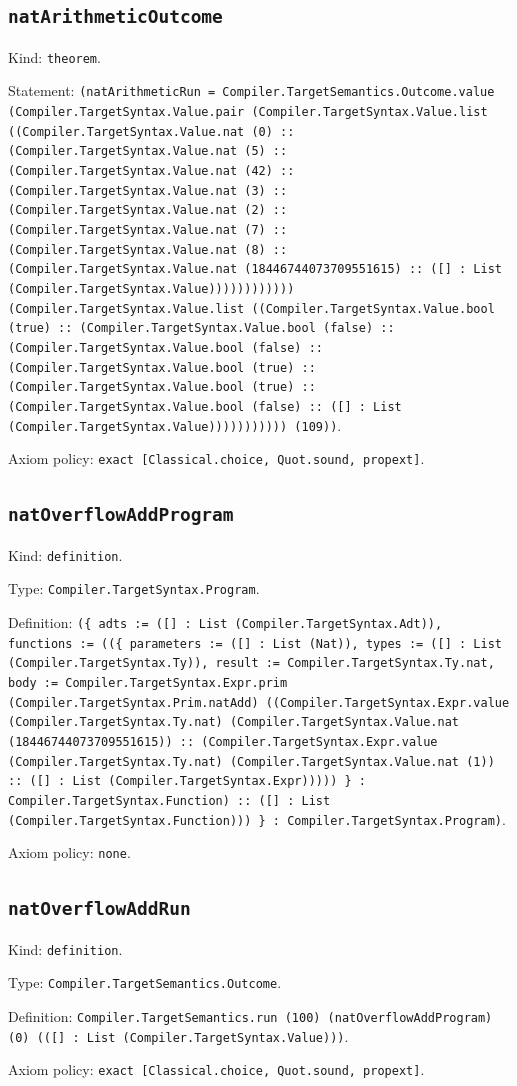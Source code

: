 \documentclass[11pt]{article}
\begin{document}
\subsection*{\texttt{natArithmeticOutcome}}
\noindent Kind: \texttt{theorem}.\par
\noindent Statement: \texttt{(natArithmeticRun = Compiler.TargetSemantics.Outcome.value (Compiler.TargetSyntax.Value.pair (Compiler.TargetSyntax.Value.list ((Compiler.TargetSyntax.Value.nat (0) :: (Compiler.TargetSyntax.Value.nat (5) :: (Compiler.TargetSyntax.Value.nat (42) :: (Compiler.TargetSyntax.Value.nat (3) :: (Compiler.TargetSyntax.Value.nat (2) :: (Compiler.TargetSyntax.Value.nat (7) :: (Compiler.TargetSyntax.Value.nat (8) :: (Compiler.TargetSyntax.Value.nat (18446744073709551615) :: ([] : List (Compiler.TargetSyntax.Value)))))))))))) (Compiler.TargetSyntax.Value.list ((Compiler.TargetSyntax.Value.bool (true) :: (Compiler.TargetSyntax.Value.bool (false) :: (Compiler.TargetSyntax.Value.bool (false) :: (Compiler.TargetSyntax.Value.bool (true) :: (Compiler.TargetSyntax.Value.bool (true) :: (Compiler.TargetSyntax.Value.bool (false) :: ([] : List (Compiler.TargetSyntax.Value))))))))))) (109))}.\par
\noindent Axiom policy: \texttt{exact [Classical.choice, Quot.sound, propext]}.\par
\subsection*{\texttt{natOverflowAddProgram}}
\noindent Kind: \texttt{definition}.\par
\noindent Type: \texttt{Compiler.TargetSyntax.Program}.\par
\noindent Definition: \texttt{(\{ adts := ([] : List (Compiler.TargetSyntax.Adt)), functions := ((\{ parameters := ([] : List (Nat)), types := ([] : List (Compiler.TargetSyntax.Ty)), result := Compiler.TargetSyntax.Ty.nat, body := Compiler.TargetSyntax.Expr.prim (Compiler.TargetSyntax.Prim.natAdd) ((Compiler.TargetSyntax.Expr.value (Compiler.TargetSyntax.Ty.nat) (Compiler.TargetSyntax.Value.nat (18446744073709551615)) :: (Compiler.TargetSyntax.Expr.value (Compiler.TargetSyntax.Ty.nat) (Compiler.TargetSyntax.Value.nat (1)) :: ([] : List (Compiler.TargetSyntax.Expr))))) \} : Compiler.TargetSyntax.Function) :: ([] : List (Compiler.TargetSyntax.Function))) \} : Compiler.TargetSyntax.Program)}.\par
\noindent Axiom policy: \texttt{none}.\par
\subsection*{\texttt{natOverflowAddRun}}
\noindent Kind: \texttt{definition}.\par
\noindent Type: \texttt{Compiler.TargetSemantics.Outcome}.\par
\noindent Definition: \texttt{Compiler.TargetSemantics.run (100) (natOverflowAddProgram) (0) (([] : List (Compiler.TargetSyntax.Value)))}.\par
\noindent Axiom policy: \texttt{exact [Classical.choice, Quot.sound, propext]}.\par
\end{document}
